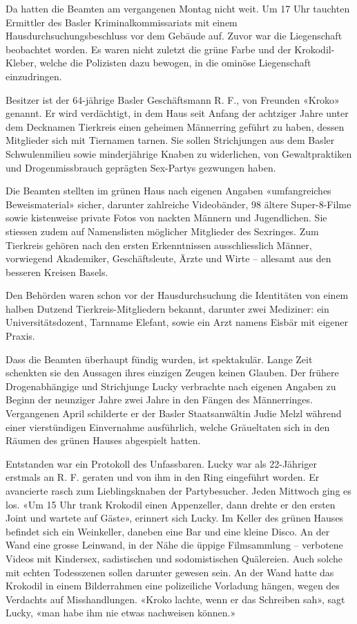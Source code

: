 Da hatten die Beamten am vergangenen Montag nicht weit. Um 17 Uhr
tauchten Ermittler des Basler Kriminalkommissariats mit einem
Hausdurchsuchungsbeschluss vor dem Gebäude auf. Zuvor war die
Liegenschaft beobachtet worden. Es waren nicht zuletzt die grüne Farbe
und der Krokodil-Kleber, welche die Polizisten dazu bewogen, in die
ominöse Liegenschaft einzudringen.

Besitzer ist der 64-jährige Basler Geschäftsmann R. F., von Freunden
«Kroko» genannt. Er wird verdächtigt, in dem Haus seit Anfang der
achtziger Jahre unter dem Decknamen Tierkreis einen geheimen Männerring
geführt zu haben, dessen Mitglieder sich mit Tiernamen tarnen. Sie
sollen Strichjungen aus dem Basler Schwulenmilieu sowie minderjährige
Knaben zu widerlichen, von Gewaltpraktiken und Drogenmissbrauch
geprägten Sex-Partys gezwungen haben.

Die Beamten stellten im grünen Haus nach eigenen Angaben «umfangreiches
Beweismaterial» sicher, darunter zahlreiche Videobänder, 98 ältere
Super-8-Filme sowie kistenweise private Fotos von nackten Männern und
Jugendlichen. Sie stiessen zudem auf Namenslisten möglicher Mitglieder
des Sexringes. Zum Tierkreis gehören nach den ersten Erkenntnissen
ausschliesslich Männer, vorwiegend Akademiker, Geschäftsleute, Ärzte und
Wirte -- allesamt aus den besseren Kreisen Basels.

Den Behörden waren schon vor der Hausdurchsuchung die Identitäten von
einem halben Dutzend Tierkreis-Mitgliedern bekannt, darunter zwei
Mediziner: ein Universitätsdozent, Tarnname Elefant, sowie ein Arzt
namens Eisbär mit eigener Praxis.

Dass die Beamten überhaupt fündig wurden, ist spektakulär. Lange Zeit
schenkten sie den Aussagen ihres einzigen Zeugen keinen Glauben. Der
frühere Drogenabhängige und Strichjunge Lucky verbrachte nach eigenen
Angaben zu Beginn der neunziger Jahre zwei Jahre in den Fängen des
Männerringes. Vergangenen April schilderte er der Basler Staatsanwältin
Judie Melzl während einer vierstündigen Einvernahme ausführlich, welche
Gräueltaten sich in den Räumen des grünen Hauses abgespielt hatten.

Entstanden war ein Protokoll des Unfassbaren. Lucky war als 22-Jähriger
erstmals an R. F. geraten und von ihm in den Ring eingeführt worden. Er
avancierte rasch zum Lieblingsknaben der Partybesucher. Jeden Mittwoch
ging es los. «Um 15 Uhr trank Krokodil einen Appenzeller, dann drehte er
den ersten Joint und wartete auf Gäste», erinnert sich Lucky. Im Keller
des grünen Hauses befindet sich ein Weinkeller, daneben eine Bar und
eine kleine Disco. An der Wand eine grosse Leinwand, in der Nähe die
üppige Filmsammlung -- verbotene Videos mit Kindersex, sadistischen und
sodomistischen Quälereien. Auch solche mit echten Todesszenen sollen
darunter gewesen sein. An der Wand hatte das Krokodil in einem
Bilderrahmen eine polizeiliche Vorladung hängen, wegen des Verdachts auf
Misshandlungen. «Kroko lachte, wenn er das Schreiben sah», sagt Lucky,
«man habe ihm nie etwas nachweisen können.»

